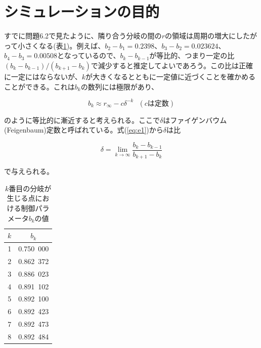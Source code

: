 \documentclass{jsarticle}
\title{}
\author{早稲田大学先進理工学部物理学科 B4 藤本將太郎}
\date{2014/05/01}
\begin{document}
\maketitle

\section{シミュレーションの目的}
すでに問題6.2で見たように、隣り合う分岐の間の$r$の領域は周期の増大にしたがって小さくなる(表\ref{tab:t1})。例えば、$b_{2}-b_{1}=0.2398$、$b_{3}-b_{2}=0.023624$、$b_{4}-b_{3}=0.00508$となっているので、$b_{k}-b_{k-1}$が等比的、つまり一定の比$(b_{k}-b_{k-1})/(b_{k+1}-b_{k})$で減少すると推定してよいであろう。この比は正確に一定にはならないが、$k$が大きくなるとともに一定値に近づくことを確かめることができる。これは$b_{k}$の数列には極限があり、

\begin{equation}
  b_{k} \approx r_{\infty} -c \delta ^{-k}\ \ \ (cは定数)
  \label{eq:e1}
\end{equation}

のように等比的に漸近すると考えられる。ここで$\delta$はファイゲンバウム(Feigenbaum)定数と呼ばれている。式(\ref{eq:e1})から$\delta$は比

\begin{equation}
 \delta = \lim_{k \rightarrow \infty} \displaystyle\frac{b_{k}-b_{k-1}}{b_{k+1}-b_{k}}
\end{equation}

で与えられる。

\begin{table}[htbp]
\begin{center}
  \caption{$k$番目の分岐が生じる点における制御パラメータ$b_{k}$の値}
  \begin{tabular}{cc}
  $k$ & $b_{k}$  \\ \hline
  1 & 0.750\ 000 \\
  2 & 0.862\ 372 \\
  3 & 0.886\ 023 \\
  4 & 0.891\ 102 \\
  5 & 0.892\ 100 \\
  6 & 0.892\ 423 \\
  7 & 0.892\ 473 \\
  8 & 0.892\ 484 \\
  \hline
  \end{tabular}
  \label{tab:t1}
\end{center}
\end{table}
\end{document}
